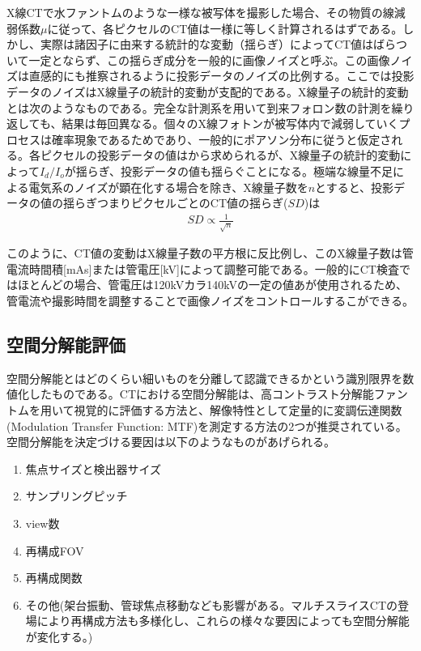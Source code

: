 X線CTで水ファントムのような一様な被写体を撮影した場合、その物質の線減弱係数$\mu$に従って、各ピクセルのCT値は一様に等しく計算されるはずである。しかし、実際は諸因子に由来する統計的な変動（揺らぎ）によってCT値はばらついて一定とならず、この揺らぎ成分を一般的に画像ノイズと呼ぶ。この画像ノイズは直感的にも推察されるように投影データのノイズの比例する。ここでは投影データのノイズはX線量子の統計的変動が支配的である。X線量子の統計的変動とは次のようなものである。完全な計測系を用いて到来フォロン数の計測を繰り返しても、結果は毎回異なる。個々のX線フォトンが被写体内で減弱していくプロセスは確率現象であるためであり、一般的にポアソン分布に従うと仮定される。各ピクセルの投影データの値はから求められるが、X線量子の統計的変動によって$I_d/I_o$が揺らぎ、投影データの値も揺らぐことになる。極端な線量不足による電気系のノイズが顕在化する場合を除き、X線量子数を$n$とすると、投影データの値の揺らぎつまりピクセルごとのCT値の揺らぎ($SD$)は
\begin{align}
SD\propto\frac{1}{\sqrt{n}}
\end{align}

このように、CT値の変動はX線量子数の平方根に反比例し、このX線量子数は管電流時間積[mAs]または管電圧[kV]によって調整可能である。一般的にCT検査ではほとんどの場合、管電圧は120kVカラ140kVの一定の値あが使用されるため、管電流や撮影時間を調整することで画像ノイズをコントロールするこができる。
\fi


\subsection{空間分解能評価}
空間分解能とはどのくらい細いものを分離して認識できるかという識別限界を数値化したものである。CTにおける空間分解能は、高コントラスト分解能ファントムを用いて視覚的に評価する方法と、解像特性として定量的に変調伝達関数(Modulation Transfer Function: MTF)を測定する方法の2つが推奨されている。空間分解能を決定づける要因は以下のようなものがあげられる。
\begin{enumerate}
\item 焦点サイズと検出器サイズ
\item サンプリングピッチ
\item view数
\item 再構成FOV
\item 再構成関数
\item その他(架台振動、管球焦点移動なども影響がある。マルチスライスCTの登場により再構成方法も多様化し、これらの様々な要因によっても空間分解能が変化する。)
\end{enumerate}

